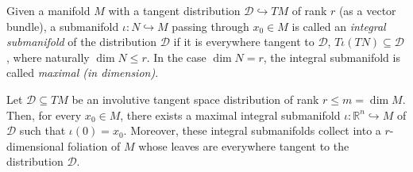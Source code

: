 \begin{definition} \label{def:int-subman}
Given a manifold $M$ with a tangent distribution $\mathcal{D} \hookrightarrow
TM$ of rank $r$ (as a vector bundle), a submanifold $\iota\colon N
\hookrightarrow M$ passing through $x_0 \in M$ is called an \emph{integral
submanifold} of the distribution $\mathcal{D}$ if it is everywhere tangent to
$\mathcal{D}$, $T\iota (TN) \subseteq \mathcal{D}$, where naturally $\dim N \le
r$. In the case $\dim N = r$, the integral submanifold is called \emph{maximal
(in dimension)}.
\end{definition}

\begin{definition}[foliation] \label{def:foliation}
\notready
\end{definition}

\begin{theorem} \label{thm:frob-vec}
Let $\mathcal{D} \subseteq TM$ be an involutive tangent space distribution of
rank $r\le m = \dim M$. Then, for every $x_0\in M$, there exists a maximal
integral submanifold $\iota\colon \mathbb{R}^n \hookrightarrow M$ of
$\mathcal{D}$ such that $\iota(0) = x_0$. Moreover, these integral submanifolds
collect into a $r$-dimensional foliation of $M$ whose leaves are everywhere
tangent to the distribution $\mathcal{D}$.
\end{theorem}
